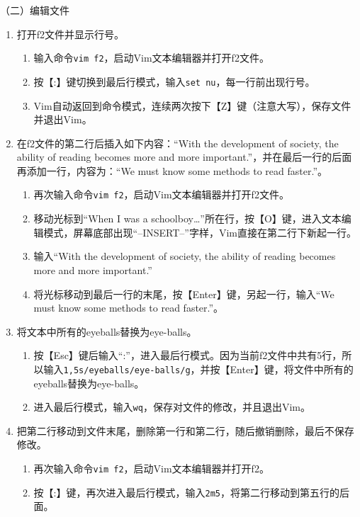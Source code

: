 \vspace{0.1in}
（二）编辑文件
\begin{enumerate}
  \item 打开f2文件并显示行号。
    \begin{enumerate}
      \item 输入命令\verb|vim f2|，启动Vim文本编辑器并打开f2文件。
      \item 按【:】键切换到最后行模式，输入\verb|set nu|，每一行前出现行号。
      \item Vim自动返回到命令模式，连续两次按下【Z】键（注意大写），保存文件并退出Vim。
    \end{enumerate}
  \item 在f2文件的第二行后插入如下内容：“With the development of society, the ability of reading becomes more and more important.”，并在最后一行的后面再添加一行，内容为：“We must know some methods to read faster.”。
    \begin{enumerate}
      \item 再次输入命令\verb|vim f2|，启动Vim文本编辑器并打开f2文件。
      \item 移动光标到“When I was a schoolboy…”所在行，按【O】键，进入文本编辑模式，屏幕底部出现“--INSERT--”字样，Vim直接在第二行下新起一行。
      \item 输入“With the development of society, the ability of reading becomes more and more important.”
      \item 将光标移动到最后一行的末尾，按【Enter】键，另起一行，输入“We must know some methods to read faster.”。
    \end{enumerate}
  \item 将文本中所有的eyeballs替换为eye-balls。
    \begin{enumerate}
      \item
	按【Esc】键后输入“:”，进入最后行模式。因为当前f2文件中共有5行，所以输入\verb|1,5s/eyeballs/eye-balls/g|，并按【Enter】键，将文件中所有的eyeballs替换为eye-balls。
      \item 进入最后行模式，输入\verb|wq|，保存对文件的修改，并且退出Vim。
    \end{enumerate}
  \item 把第二行移动到文件末尾，删除第一行和第二行，随后撤销删除，最后不保存修改。
    \begin{enumerate}
      \item 再次输入命令\verb|vim f2|，启动Vim文本编辑器并打开f2。
      \item 按【:】键，再次进入最后行模式，输入\verb|2m5|，将第二行移动到第五行的后面。

\end{enumerate}
\end{enumerate}
